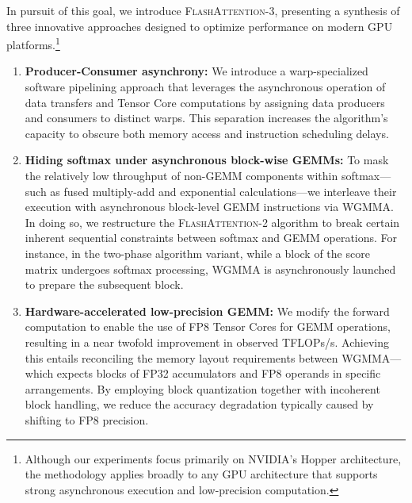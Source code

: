 In pursuit of this goal, we introduce \textsc{FlashAttention-3}, presenting a synthesis of three innovative approaches designed to optimize performance on modern GPU platforms.\footnote{Although our experiments focus primarily on NVIDIA's Hopper architecture, the methodology applies broadly to any GPU architecture that supports strong asynchronous execution and low-precision computation.}

\begin{enumerate}

\item \textbf{Producer-Consumer asynchrony:} We introduce a warp-specialized software pipelining approach that leverages the asynchronous operation of data transfers and Tensor Core computations by assigning data producers and consumers to distinct warps. This separation increases the algorithm’s capacity to obscure both memory access and instruction scheduling delays.

\item \textbf{Hiding softmax under asynchronous block-wise GEMMs:} To mask the relatively low throughput of non-GEMM components within softmax—such as fused multiply-add and exponential calculations—we interleave their execution with asynchronous block-level GEMM instructions via WGMMA. In doing so, we restructure the \textsc{FlashAttention-2} algorithm to break certain inherent sequential constraints between softmax and GEMM operations. For instance, in the two-phase algorithm variant, while a block of the score matrix undergoes softmax processing, WGMMA is asynchronously launched to prepare the subsequent block.

\item \textbf{Hardware-accelerated low-precision GEMM:} We modify the forward computation to enable the use of FP8 Tensor Cores for GEMM operations, resulting in a near twofold improvement in observed TFLOPs/s. Achieving this entails reconciling the memory layout requirements between WGMMA—which expects blocks of FP32 accumulators and FP8 operands in specific arrangements. By employing block quantization together with incoherent block handling, we reduce the accuracy degradation typically caused by shifting to FP8 precision.
\end{enumerate}

